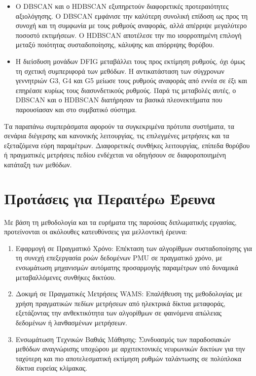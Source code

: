 \begin{itemize}
    \item Ο DBSCAN και ο HDBSCAN εξυπηρετούν διαφορετικές
    προτεραιότητες αξιολόγησης. Ο DBSCAN εμφάνισε την καλύτερη συνολική
    επίδοση ως προς τη συνοχή και τη συμφωνία με τους ρυθμούς αναφοράς, αλλά
    απέρριψε μεγαλύτερο ποσοστό εκτιμήσεων. Ο HDBSCAN αποτέλεσε την πιο
    ισορροπημένη επιλογή μεταξύ ποιότητας συσταδοποίησης, κάλυψης και
    απόρριψης θορύβου.

    \item Η διείσδυση μονάδων DFIG μεταβάλλει τους προς εκτίμηση
    ρυθμούς, όχι όμως τη σχετική συμπεριφορά των μεθόδων. Η αντικατάσταση
    των σύγχρονων γεννητριών G3, G4 και G5 μείωσε τους ρυθμούς αναφοράς από
    εννέα σε έξι και επηρέασε κυρίως τους διασυνδετικούς ρυθμούς. Παρά τις
    μεταβολές αυτές, ο DBSCAN και ο HDBSCAN διατήρησαν τα βασικά
    πλεονεκτήματα που παρουσίασαν και στο συμβατικό σύστημα.
\end{itemize}

Τα παραπάνω συμπεράσματα αφορούν τα συγκεκριμένα πρότυπα συστήματα, τα σενάρια διέγερσης και κανονικής λειτουργίας, τις επιλεγμένες
μετρήσεις και τα εξεταζόμενα εύρη παραμέτρων. Διαφορετικές συνθήκες
λειτουργίας, επίπεδα θορύβου ή πραγματικές μετρήσεις πεδίου ενδέχεται να
οδηγήσουν σε διαφοροποιημένη κατάταξη των μεθόδων.

\section{Προτάσεις για Περαιτέρω Έρευνα}

Με βάση τη μεθοδολογία και τα ευρήματα της παρούσας διπλωματικής εργασίας, προτείνονται οι ακόλουθες κατευθύνσεις για μελλοντική έρευνα:

\begin{enumerate}
    \item Εφαρμογή σε Πραγματικό Χρόνο: Επέκταση των αλγορίθμων συσταδοποίησης για τη συνεχή επεξεργασία ροών δεδομένων PMU σε πραγματικό χρόνο, με ενσωμάτωση μηχανισμών αυτόματης προσαρμογής παραμέτρων υπό δυναμικά μεταβαλλόμενες συνθήκες δικτύου.
    \item Δοκιμή σε Πραγματικές Μετρήσεις WAMS: Επαλήθευση της μεθοδολογίας με χρήση πραγματικών πεδίων μετρήσεων από ηλεκτρικά δίκτυα μεταφοράς, εξετάζοντας την ανθεκτικότητα των αλγορίθμων σε φαινόμενα απώλειας δεδομένων ή λανθασμένων μετρήσεων.
    \item Ενσωμάτωση Τεχνικών Βαθιάς Μάθησης: Συνδυασμός των παραδοσιακών μεθόδων αναγνώρισης υποχώρου με αρχιτεκτονικές νευρωνικών δικτύων για την ταχύτερη και πιο αποτελεσματική εκτίμηση ρυθμών ταλάντωσης σε πολύπλοκα δίκτυα ευρείας κλίμακας.
\end{enumerate}
